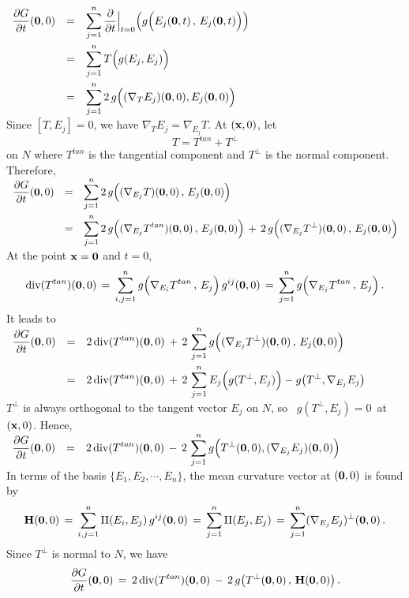 \documentclass{article}[12pt,a4paper]
\begin{document}
$\begin{array}{rcl}
\displaystyle \frac{\partial G}{\partial t}({\bf 0}, 0) &=& \displaystyle
	\sum_{j=1}^n \frac{\partial}{\partial t}\Big\vert_{t=0}\Big(g\Big(E_j({\bf 0}, t) \,,\, E_j({\bf 0}, t)\Big) \Big) \\[0.2in]
&=& \displaystyle 
	\sum_{j=1}^n T\Big(g(E_j, E_j)\Big) \\[0.2in]
&=& \displaystyle 
	\sum_{j=1}^n 2\,g\Big((\nabla_T E_j)({\bf 0},0), E_j({\bf 0},0) \Big) 
\end{array}$ \\[0.2in]
Since $[T, E_j] = 0$, we have $\nabla_T E_j = \nabla_{E_j}T$.
At $({\bf x}, 0)$, let 
$$T = T^{tan} + T^\perp $$
on $N$ where $T^{tan}$ is the tangential component and $T^\perp$ is the normal component. Therefore, \\[0.1in]
$\begin{array}{rcl}
\displaystyle \frac{\partial G}{\partial t}({\bf 0}, 0) &=& \displaystyle 
	\sum_{j=1}^n 2\,g\Big((\nabla_{E_j} T)({\bf 0},0)\,,\, E_j({\bf 0},0)\Big) \\[0.2in]
&=& \displaystyle 
	\sum_{j=1}^n 2\,g\Big((\nabla_{E_j} T^{tan})({\bf 0},0)\,,\, E_j({\bf 0},0)\Big) 
	\,+\, 2\,g\Big((\nabla_{E_j} T^\perp)({\bf 0},0)\,,\,E_j({\bf 0},0)\Big) \\
\end{array}$ \\[0.2in]
At the point ${\bf x} = {\bf 0}$ and $t=0$, 
$$ \mbox{div}(T^{tan})({\bf 0},0) \,=\, 
	\sum_{i, j=1}^n	g\Big(\nabla_{E_i} T^{tan}\,,\, E_j\Big)\, g^{ij}({\bf 0},0) \,=\,
	\sum_{j=1}^n	g\Big(\nabla_{E_j} T^{tan}\,,\, E_j\Big)\,.$$
It leads to \\[0.1in]
$\begin{array}{rcl}
\displaystyle \frac{\partial G}{\partial t}({\bf 0}, 0) &=& \displaystyle
	2\,\mbox{div}(T^{tan})({\bf 0},0) \,+\, 
	2\,\sum_{j=1}^n g\Big((\nabla_{E_j}T^\perp)({\bf 0},0)\,,\,E_j({\bf 0},0)\Big) \\[0.2in]
&=& \displaystyle 
	2\,\mbox{div}(T^{tan})({\bf 0},0) \,+\, 2\,\sum_{j=1}^n E_j\Big(g(T^\perp, E_j)\Big)
	- g\big(T^\perp, \nabla_{E_j}E_j\big) \\
\end{array}$ \\[0.2in]
$T^\perp$ is always orthogonal to the tangent vector $E_j$ on $N$, 
so \, $g(T^\perp, E_j)=0$\, at $({\bf x}, 0)$. Hence, \\[0.1in]
$\begin{array}{rcl}
\displaystyle \frac{\partial G}{\partial t}({\bf 0}, 0) &=& \displaystyle
	2\,\mbox{div}(T^{tan})({\bf 0}, 0) 
	\,-\, 2\,\sum_{j=1}^n g\Big(T^\perp({\bf 0}, 0), (\nabla_{E_j}E_j)({\bf 0}, 0) \Big) \\
\end{array}$ \\[0.2in]
In terms of the basis $\{E_1, E_2, \cdots, E_n\}$, 
the mean curvature vector at $({\bf 0},0)$ is found by 
$$ {\bf H}({\bf 0},0) \,=\, \sum_{i,j=1}^n \mbox{II}(E_i, E_j)\, g^{ij}({\bf 0}, 0) 
	\,=\, \sum_{j=1}^n \mbox{II}(E_j, E_j) \,=\,
	\sum_{j=1}^n (\nabla_{E_j}E_j)^\perp({\bf 0}, 0)\,.$$
Since $T^\perp$ is normal to $N$, we have
$$ 
\frac{\partial G}{\partial t}({\bf 0}, 0) \,=\, 2\,\mbox{div}(T^{tan})({\bf 0}, 0)
 	\,-\, 2\, g\big(T^\perp({\bf 0}, 0) \,,\, {\bf H}({\bf 0},0)\big) \,.
$$ 
\newpage
\end{document}
